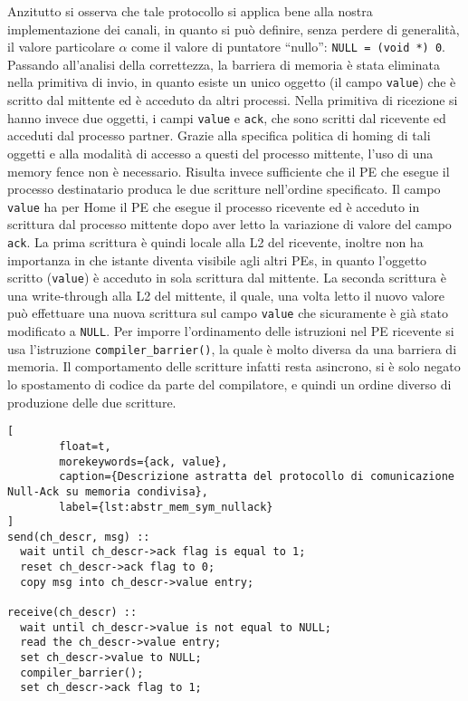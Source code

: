 Anzitutto si osserva che tale protocollo si applica bene alla nostra implementazione dei canali, in quanto si pu\`o definire, senza perdere di generalit\`a, il valore particolare $\alpha$ come il valore di puntatore ``nullo'': \verb+NULL = (void *) 0+. 
Passando all'analisi della correttezza, la barriera di memoria \`e stata eliminata nella primitiva di invio, in quanto esiste un unico oggetto (il campo \verb+value+) che \`e scritto dal mittente ed \`e acceduto da altri processi.
Nella primitiva di ricezione si hanno invece due oggetti, i campi \verb+value+ e \verb+ack+, che sono scritti dal ricevente ed acceduti dal processo partner. Grazie alla specifica politica di homing di tali oggetti e alla modalit\`a di accesso a questi del processo mittente, l'uso di una memory fence non \`e necessario. Risulta invece sufficiente che il PE che esegue il processo destinatario produca le due scritture nell'ordine specificato. Il campo \verb+value+ ha per Home il PE che esegue il processo ricevente ed \`e acceduto in scrittura dal processo mittente dopo aver letto la variazione di valore del campo \verb+ack+. La prima scrittura \`e quindi locale alla L2 del ricevente, inoltre non ha importanza in che istante diventa visibile agli altri PEs, in quanto l'oggetto scritto (\verb+value+) \`e acceduto in sola scrittura dal mittente. La seconda scrittura \`e una write-through alla L2 del mittente, il quale, una volta letto il nuovo valore pu\`o effettuare una nuova scrittura sul campo \verb+value+ che sicuramente \`e gi\`a stato modificato a \verb+NULL+. Per imporre l'ordinamento delle istruzioni nel PE ricevente si usa l'istruzione \verb+compiler_barrier()+, la quale \`e molto diversa da una barriera di memoria. Il comportamento delle scritture infatti resta asincrono, si \`e solo negato lo spostamento di codice da parte del compilatore, e quindi un ordine diverso di produzione delle due scritture.

\begin{lstlisting}[
        float=t,
        morekeywords={ack, value}, 
        caption={Descrizione astratta del protocollo di comunicazione Null-Ack su memoria condivisa},
        label={lst:abstr_mem_sym_nullack}
]
send(ch_descr, msg) ::
  wait until ch_descr->ack flag is equal to 1;
  reset ch_descr->ack flag to 0;
  copy msg into ch_descr->value entry;

receive(ch_descr) ::
  wait until ch_descr->value is not equal to NULL;
  read the ch_descr->value entry;
  set ch_descr->value to NULL;
  compiler_barrier();
  set ch_descr->ack flag to 1;
\end{lstlisting}
